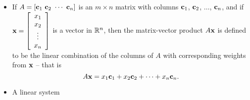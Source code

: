 \label{sec:mv_form_summ}

\begin{itemize}
\item If $A = [\vc_1 \ \vc_2 \ \cdots \ \vc_n]$ is an $m \times n$ matrix with columns $\mathbf{c}_1$, $\mathbf{c}_2$, $\ldots$, $\mathbf{c}_n$, and if $\mathbf{x} = \left[ \begin{array}{c} x_1\\x_2\\ \vdots \\ x_n \end{array} \right]$ is a vector in $\mathbb{R}^n$, then the matrix-vector product $A \mathbf{x}$ is defined to be the linear combination of the columns of $A$ with corresponding weights from $\mathbf{x}$ -- that is 
\[A \mathbf{x} = x_1 \mathbf{c}_1 + x_2 \mathbf{c}_2 + \cdots + x_n \mathbf{c}_n.\]
\item A linear system


\end{itemize}
